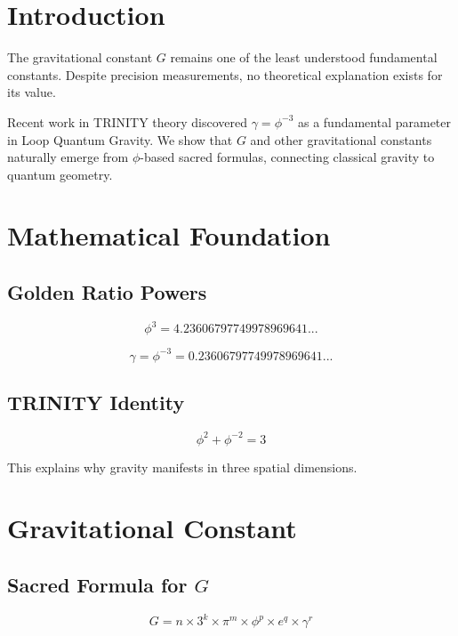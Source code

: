 \documentclass[12pt,a4paper]{article}
\begin{document}
\section{Introduction}

The gravitational constant $G$ remains one of the least understood fundamental constants. Despite precision measurements, no theoretical explanation exists for its value.

Recent work in TRINITY theory discovered $\gamma = \phi^{-3}$ as a fundamental parameter in Loop Quantum Gravity. We show that $G$ and other gravitational constants naturally emerge from $\phi$-based sacred formulas, connecting classical gravity to quantum geometry.

\section{Mathematical Foundation}

\subsection{Golden Ratio Powers}

\begin{equation}
\phi^3 = 4.23606797749978969641...
\end{equation}

\begin{equation}
\gamma = \phi^{-3} = 0.23606797749978969641...
\end{equation}

\subsection{TRINITY Identity}

\begin{equation}
\phi^2 + \phi^{-2} = 3
\end{equation}

This explains why gravity manifests in three spatial dimensions.

\section{Gravitational Constant}

\subsection{Sacred Formula for $G$}

\begin{equation}
G = n \times 3^k \times \pi^m \times \phi^p \times e^q \times \gamma^r
\end{equation}
\end{document}
